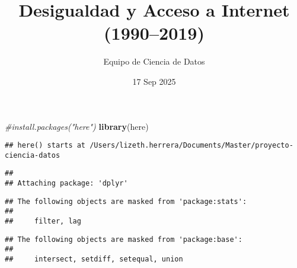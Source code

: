 \documentclass[
  ignorenonframetext,
]{beamer}
\title{Desigualdad y Acceso a Internet (1990--2019)}
\author{Equipo de Ciencia de Datos}
\date{17 Sep 2025}
\newenvironment{Shaded}{\begin{snugshade}}{\end{snugshade}}
\newcommand{\AttributeTok}[1]{\textcolor[rgb]{0.13,0.29,0.53}{#1}}
\newcommand{\CommentTok}[1]{\textcolor[rgb]{0.56,0.35,0.01}{\textit{#1}}}
\newcommand{\ConstantTok}[1]{\textcolor[rgb]{0.56,0.35,0.01}{#1}}
\newcommand{\FunctionTok}[1]{\textcolor[rgb]{0.13,0.29,0.53}{\textbf{#1}}}
\newcommand{\NormalTok}[1]{#1}
\newcommand{\OtherTok}[1]{\textcolor[rgb]{0.56,0.35,0.01}{#1}}
\newcommand{\SpecialCharTok}[1]{\textcolor[rgb]{0.81,0.36,0.00}{\textbf{#1}}}
\newcommand{\StringTok}[1]{\textcolor[rgb]{0.31,0.60,0.02}{#1}}
\begin{document}
\frame{\titlepage}

\begin{frame}[fragile]
\begin{Shaded}
\begin{Highlighting}[]
\CommentTok{\#install.packages("here")}
\FunctionTok{library}\NormalTok{(here)}
\end{Highlighting}
\end{Shaded}

\begin{verbatim}
## here() starts at /Users/lizeth.herrera/Documents/Master/proyecto-ciencia-datos
\end{verbatim}

\begin{Shaded}
\end{Shaded}

\begin{verbatim}
## 
## Attaching package: 'dplyr'
\end{verbatim}

\begin{verbatim}
## The following objects are masked from 'package:stats':
## 
##     filter, lag
\end{verbatim}

\begin{verbatim}
## The following objects are masked from 'package:base':
## 
##     intersect, setdiff, setequal, union
\end{verbatim}


\end{frame}
\end{document}
